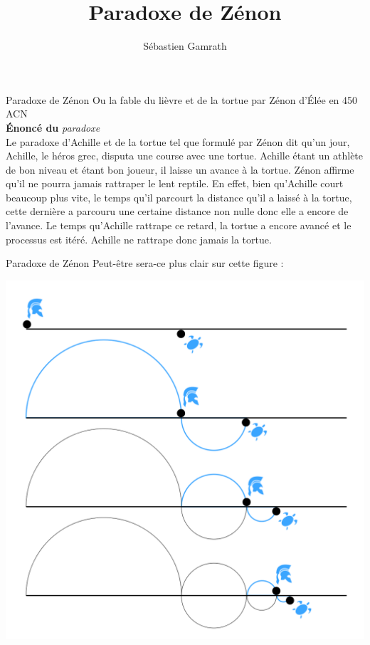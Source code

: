 \documentclass[11pt]{beamer}
\author{Sébastien Gamrath}
\title{Paradoxe de Zénon}
\begin{document}
\begin{frame}{Paradoxe de Zénon}
	\pause Ou la fable du lièvre et de la tortue par Zénon d'\'{E}lée en 450 ACN
	\vspace{0.5cm}
	\pause \\ \color{umons-red} \textbf{\'{E}noncé du} \textit{paradoxe}
	\pause \\ \color{black}Le paradoxe d'Achille et de la tortue tel que formulé par Zénon dit qu'un jour, Achille, le héros grec, disputa une course avec une tortue. Achille étant un athlète de bon niveau et étant bon joueur, il laisse un avance à la tortue. \pause Zénon affirme qu'il ne pourra jamais rattraper le lent reptile. En effet, bien qu'Achille court beaucoup plus vite, le temps qu'il parcourt la distance qu'il a laissé à la tortue, cette dernière a parcouru une certaine distance non nulle donc elle a encore de l'avance. Le temps qu'Achille rattrape ce retard, la tortue a encore avancé et le processus est itéré. Achille ne rattrape donc jamais la tortue.
\end{frame}
\begin{frame}{Paradoxe de Zénon}
	Peut-être sera-ce plus clair sur cette figure : 
	\begin{center}
		\includegraphics[scale=0.2]{ZAPT1.png}
	\end{center}
\end{frame}
\end{document}
